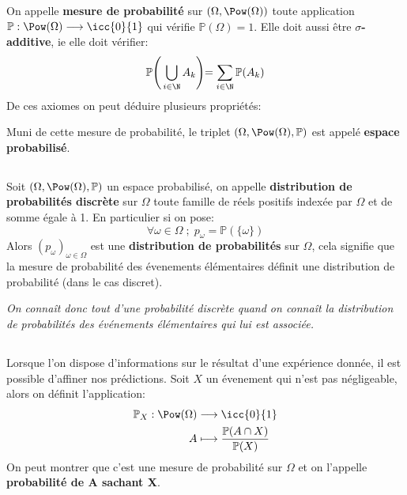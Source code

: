 On appelle \textbf{mesure de probabilité} sur \((\Omega, \Pow(\Omega))\) toute application \(\mathbb{P} : \Pow(\Omega)\longrightarrow \icc{0}{1}\) qui vérifie \(\mathbb{P}(\Omega) = 1\).\+
Elle doit aussi être \textbf{\(\sigma\)-additive}, ie elle doit vérifier:
\[
   \mathbb{P}\Biggl(\,\bigcup_{i \in \N} A_k\Biggl) = \sum_{i \in \N}\mathbb{P}(A_k)
\]
De ces axiomes on peut déduire plusieurs propriétés:


Muni de cette mesure de probabilité, le triplet \((\Omega, \Pow(\Omega), \mathbb{P})\) est appelé \textbf{espace probabilisé}.

\subsection*{}
Soit \((\Omega, \Pow(\Omega), \mathbb{P})\) un espace probabilisé, on appelle \textbf{distribution de probabilités discrète} sur \(\Omega\) toute famille de réels positifs
indexée par \(\Omega\) et de somme égale à 1. En particulier si on pose:
\[
   \forall \omega \in \Omega \; ; \; p_\omega = \mathbb{P}(\{\omega\})   
\]
Alors \((p_\omega)_{\omega \in \Omega}\) est une \textbf{distribution de probabilités} sur \(\Omega\), cela signifie que la mesure de probabilité des évenements élémentaires définit une distribution de probabilité (dans le cas discret).
\begin{center}
   \textit{On connaît donc tout d'une probabilité discrète quand on connaît\+ la distribution de probabilités des événements élémentaires qui lui est associée. }
\end{center}

\subsection*{}
Lorsque l'on dispose d'informations sur le résultat d'une expérience donnée, il est possible d'affiner nos
prédictions. \+
Soit \(X\) un évenement qui n'est pas négligeable, alors on définit l'application:
\[
   \begin{aligned}
      \mathbb{P}_X: \Pow(\Omega) &\longrightarrow \icc{0}{1}\\
      A &\longmapsto \frac{\mathbb{P}(A \cap X)}{\mathbb{P}(X)}
   \end{aligned}
\]
On peut montrer que c'est une mesure de probabilité sur \(\Omega\) et on l'appelle \textbf{probabilité de A sachant X}.\+

